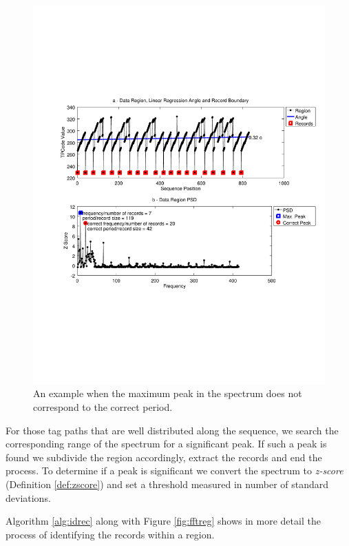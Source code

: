 \documentclass{vldb}
\begin{document}
\begin{figure}[h]
  \centering
     \includegraphics[trim={2.5cm 7.5cm 1cm 6.5cm}, width=\linewidth
     ]{img/fftleak.pdf}
  \caption{An example when the maximum peak in the spectrum does not correspond to the correct period.}
  \label{fig:fftleak}
\end{figure}

For those tag paths that are well distributed along the sequence, we search the
corresponding range of the spectrum for a significant peak. If such a peak is
found we subdivide the region accordingly, extract the records and end the
process. To determine if a peak is significant we convert the spectrum to
\textit{z-score} (Definition \ref{def:zscore}) and set a threshold measured in
number of standard deviations.

Algorithm \ref{alg:idrec} along with Figure \ref{fig:fftreg} shows in more
detail the process of identifying the records within a region.
\end{document}
